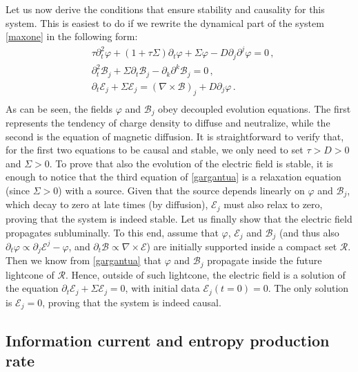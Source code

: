 \documentclass[a4paper, amsfonts, amssymb, amsmath, reprint, showkeys, nofootinbib, twoside,notitlepage,onecolumn,preprintnumbers]{revtex4-2}
\theoremstyle{definition}
\theoremstyle{theorem}
\theoremstyle{corollary}
\begin{document}
Let us now derive the conditions that ensure stability and causality for this system. This is easiest to do if we rewrite the dynamical part of the system \eqref{maxone} in the following form:
\begin{equation}\label{gargantua}
\begin{split}
& \tau \partial^2_t \varphi +(1+\tau \Sigma )\partial_t \varphi +\Sigma \varphi -D \partial_j \partial^j \varphi =0  \, ,\\
& \partial^2_t \mathcal{B}_j +\Sigma \partial_t \mathcal{B}_j-\partial_k \partial^k \mathcal{B}_j =0  \, ,\\
& \partial_t \mathcal{E}_j + \Sigma \mathcal{E}_j =(\nabla \times \mathcal{B})_j +D \partial_j \varphi  \, .\\
\end{split}
\end{equation}
As can be seen, the fields $\varphi$ and $\mathcal{B}_j$ obey decoupled evolution equations. The first represents the tendency of charge density to diffuse and neutralize, while the second is the equation of magnetic diffusion. It is straightforward to verify that, for the first two equations to be causal and stable, we only need to set $\tau >D>0$ and $\Sigma>0$. To prove that also the evolution of the electric field is stable, it is enough to notice that the third equation of \eqref{gargantua} is a relaxation equation (since $\Sigma>0$) with a source. Given that the source depends linearly on $\varphi$ and $\mathcal{B}_j$, which decay to zero at late times (by diffusion),  $\mathcal{E}_j$ must also relax to zero, proving that the system is indeed stable. Let us finally show that the electric field propagates subluminally. To this end,  assume that $\varphi$, $\mathcal{E}_j$ and $\mathcal{B}_j$ (and thus also $\partial_t \varphi \propto \partial_j \mathcal{E}^j-\varphi$, and $\partial_t \mathcal{B} \propto \nabla {\times} \mathcal{E}$) are initially supported inside a compact set $\mathcal{R}$. Then we know from \eqref{gargantua} that $\varphi$ and $\mathcal{B}_j$ propagate inside the future lightcone of $\mathcal{R}$. Hence, outside of such lightcone, the electric field is a solution of the equation $\partial_t \mathcal{E}_j + \Sigma \mathcal{E}_j=0$, with initial data $\mathcal{E}_j(t{=}0)=0$. The only solution is $\mathcal{E}_j=0$, proving that the system is indeed causal.


\subsection{Information current and entropy production rate}
\end{document}
